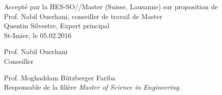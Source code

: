 \begin{titlepage}
	\begin{flushleft}
			Accepté par la HES-SO//Master (Suisse, Lausanne) sur proposition de\\
			
			\vspace{0.5cm}
			Prof. Nabil Ouerhani, conseiller de travail de Master\\
			Quentin Silvestre, Expert principal\\
			\vspace{1cm}
			St-Imier, le 05.02.2016\\
			\vspace{3cm}
			\begin{multicols}{2}
			Prof. Nabil Ouerhani\\
			Conseiller\\
			
			\columnbreak
			
			Prof. Moghaddam Bützberger Fariba\\
			Responsable de la filière \textit{Master of Science in Engineering}.\\
		\end{multicols}
	\end{flushleft}
\end{titlepage}